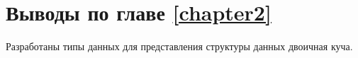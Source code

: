 


\section{Выводы по главе \ref{chapter2}}
Разработаны типы данных для представления структуры данных двоичная куча.
